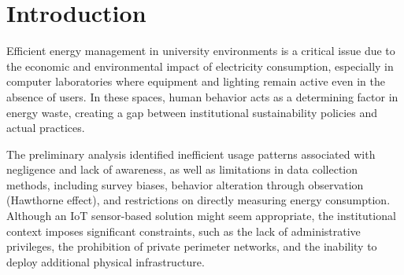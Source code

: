 \documentclass[12pt,a4paper]{article}
\begin{document}
\begin{abstract}
This report addresses the problem of inefficient energy consumption in the laboratories of the Engineering Faculty, characterized by the prolonged use of computing equipment and lighting systems in unoccupied spaces—a phenomenon strongly influenced by human behavior. Based on a preliminary systems analysis utilizing direct observation, structured surveys, and environmental correlation, we identified patterns of energy waste and institutional limitations, particularly regarding strict IT security policies that restrict the implementation of traditional hardware-based or centralized network solutions. In response to these conditions, this document outlines the design of a decentralized, software-defined solution intended to operate within the user-space. This is achieved through autonomous agents capable of monitoring inactivity, generating deterrent alerts (nudges), and executing energy-saving actions without requiring administrative privileges or modifications to the existing infrastructure.
\end{abstract}

\newpage
\tableofcontents
\newpage
\listoffigures
\newpage


\section{Introduction}
Efficient energy management in university environments is a critical issue due to the economic and environmental impact of electricity consumption, especially in computer laboratories where equipment and lighting remain active even in the absence of users. In these spaces, human behavior acts as a determining factor in energy waste, creating a gap between institutional sustainability policies and actual practices.

The preliminary analysis identified inefficient usage patterns associated with negligence and lack of awareness, as well as limitations in data collection methods, including survey biases, behavior alteration through observation (Hawthorne effect), and restrictions on directly measuring energy consumption. Although an IoT sensor-based solution might seem appropriate, the institutional context imposes significant constraints, such as the lack of administrative privileges, the prohibition of private perimeter networks, and the inability to deploy additional physical infrastructure.
\end{document}

